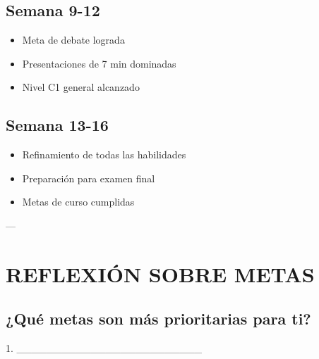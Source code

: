 \documentclass[a4paper,11pt]{article}
\begin{document}
\vspace{0.2cm}

\subsection{Semana 9-12}

\begin{itemize}

  \item [ ] Meta de debate lograda

  \item [ ] Presentaciones de 7 min dominadas

  \item [ ] Nivel C1 general alcanzado

\end{itemize}

\vspace{0.2cm}

\subsection{Semana 13-16}

\begin{itemize}

  \item [ ] Refinamiento de todas las habilidades

  \item [ ] Preparación para examen final

  \item [ ] Metas de curso cumplidas

\end{itemize}

\vspace{0.2cm}

---

\vspace{0.2cm}

\section{REFLEXIÓN SOBRE METAS}

\vspace{0.2cm}

\subsection{¿Qué metas son más prioritarias para ti?}

1. _________________________
\end{document}
